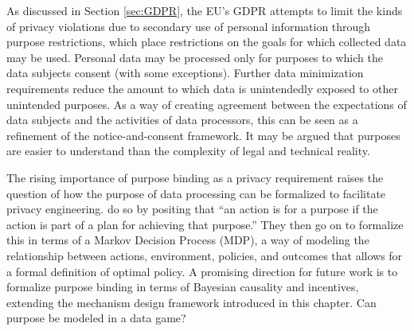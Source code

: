 \documentclass[../thesis.tex]{subfiles}
\begin{document}
As discussed in Section \ref{sec:GDPR},
the EU's GDPR attempts to limit the kinds of privacy
violations due to secondary use of personal information
through purpose restrictions,
which place restrictions on the goals for which collected
data may be used.
Personal data may be processed only for purposes to which
the data subjects consent (with some exceptions).
Further data minimization requirements reduce the amount
to which data is unintendedly exposed to other unintended purposes.
As a way of creating agreement between the expectations of data
subjects and the activities of data processors, this can be
seen as a refinement of the notice-and-consent framework.
It may be argued that purposes are easier to understand
than the complexity of legal and technical reality.

The rising importance of purpose binding as a privacy requirement
raises the question of how the purpose of data processing can
be formalized to facilitate privacy engineering.
\citet{tschantz2012formalizing} \cite{tschantz13esorics}
do so by positing that ``an action is for a purpose if the
action is part of a plan for achieving that purpose.''
They then go on to formalize this in terms of
a Markov Decision Process (MDP), a way of modeling
the relationship between actions,
environment, policies, and outcomes that allows for a formal definition of optimal policy.
A promising direction for future work is to formalize
purpose binding in terms of Bayesian causality and incentives,
extending the mechanism design framework introduced in
this chapter.
Can purpose be modeled in a data game?
\end{document}
